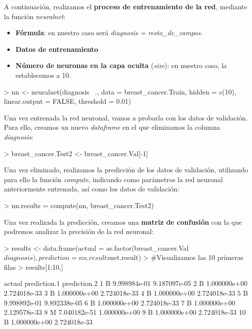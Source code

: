 \documentclass [a4paper] {article}
\begin{document}
A continuación, realizamos el \textbf{proceso de entrenamiento de la red}, mediante la función \textit{neuralnet}:

\begin{itemize}
  \item \textbf{Fórmula}: en nuestro caso será \textit{diagnosis = resto\_de\_campos.}
  \item \textbf{Datos de entrenamiento}
  \item \textbf{Número de neuronas en la capa oculta} (\textit{size}): en nuestro caso, la establecemos a 10.
\end{itemize}

\begin{Schunk}
\begin{Sinput}
> nn <- neuralnet(diagnosis ~., data = breast_cancer.Train, hidden = c(10), linear.output = FALSE, threshold = 0.01)
\end{Sinput}
\end{Schunk}

Una vez entrenada la red neuronal, vamos a probarla con los datos de validación. Para ello, creamos un nuevo \textit{dataframe} en el que eliminamos la columna \textit{diagnosis}:
\begin{Schunk}
\begin{Sinput}
> breast_cancer.Test2 <- breast_cancer.Val[-1]
\end{Sinput}
\end{Schunk}

Una vez eliminado, realizamos la predicción de los datos de validación, utilizando para ello la función \textit{compute}, indicando como parámetros la red neuronal anteriormente entrenada, así como los datos de validación:
\begin{Schunk}
\begin{Sinput}
> nn.results = compute(nn, breast_cancer.Test2)
\end{Sinput}
\end{Schunk}

Una vez realizada la predicción, creamos una \textbf{matriz de confusión} con la que podremos analizar la precisión de la red neuronal:
\begin{Schunk}
\begin{Sinput}
> results <- data.frame(actual = as.factor(breast_cancer.Val$diagnosis), prediction = nn.results$net.result)
> #Visualizamos las 10 primeras filas
> results[1:10,]
\end{Sinput}
\begin{Soutput}
   actual prediction.1 prediction.2
1       B 9.998984e-01 9.187097e-05
2       B 1.000000e+00 2.724018e-33
3       B 1.000000e+00 2.724018e-33
4       B 1.000000e+00 2.724018e-33
5       B 9.998892e-01 9.892338e-05
6       B 1.000000e+00 2.724018e-33
7       B 1.000000e+00 2.129578e-33
8       M 7.040182e-51 1.000000e+00
9       B 1.000000e+00 2.724018e-33
10      B 1.000000e+00 2.724018e-33
\end{Soutput}
\end{Schunk}
\end{document}
